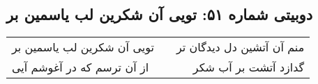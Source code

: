 \begin{center}
\section*{دوبیتی شماره ۵۱: تویی آن شکرین لب یاسمین بر}
\label{sec:051}
\begin{longtable}{l p{0.5cm} r}
تویی آن شکرین لب یاسمین بر
&&
منم آن آتشین دل دیدگان تر
\\
از آن ترسم که در آغوشم آیی
&&
گدازد آتشت بر آب شکر
\\
\end{longtable}
\end{center}
